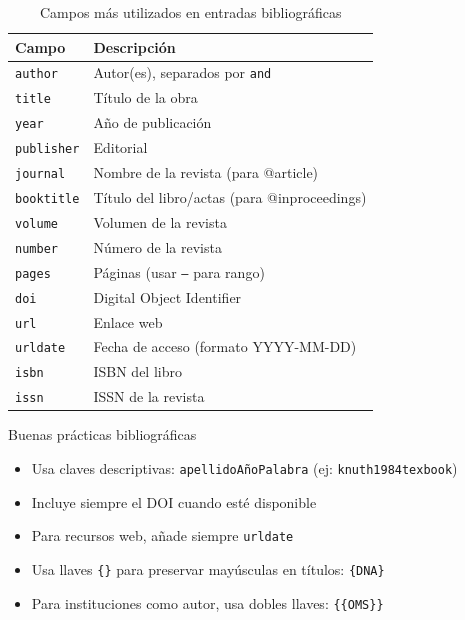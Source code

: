 \begin{table}[H]
  \centering
  \caption{Campos más utilizados en entradas bibliográficas}
  \label{tab:campos-bib}
  \begin{tabular}{lp{8cm}}
    \toprule
    \textbf{Campo} & \textbf{Descripción} \\
    \midrule
    \texttt{author}    & Autor(es), separados por \texttt{and} \\
    \texttt{title}     & Título de la obra \\
    \texttt{year}      & Año de publicación \\
    \texttt{publisher} & Editorial \\
    \texttt{journal}   & Nombre de la revista (para @article) \\
    \texttt{booktitle} & Título del libro/actas (para @inproceedings) \\
    \texttt{volume}    & Volumen de la revista \\
    \texttt{number}    & Número de la revista \\
    \texttt{pages}     & Páginas (usar \texttt{--} para rango) \\
    \texttt{doi}       & Digital Object Identifier \\
    \texttt{url}       & Enlace web \\
    \texttt{urldate}   & Fecha de acceso (formato YYYY-MM-DD) \\
    \texttt{isbn}      & ISBN del libro \\
    \texttt{issn}      & ISSN de la revista \\
    \bottomrule
  \end{tabular}
\end{table}

\begin{tipbox}{Buenas prácticas bibliográficas}
  \begin{itemize}
    \item Usa claves descriptivas: \texttt{apellidoAñoPalabra} (ej: \texttt{knuth1984texbook})
    \item Incluye siempre el DOI cuando esté disponible
    \item Para recursos web, añade siempre \texttt{urldate}
    \item Usa llaves \texttt{\{\}} para preservar mayúsculas en títulos: \texttt{\{DNA\}}
    \item Para instituciones como autor, usa dobles llaves: \texttt{\{\{OMS\}\}}
  \end{itemize}
\end{tipbox}

